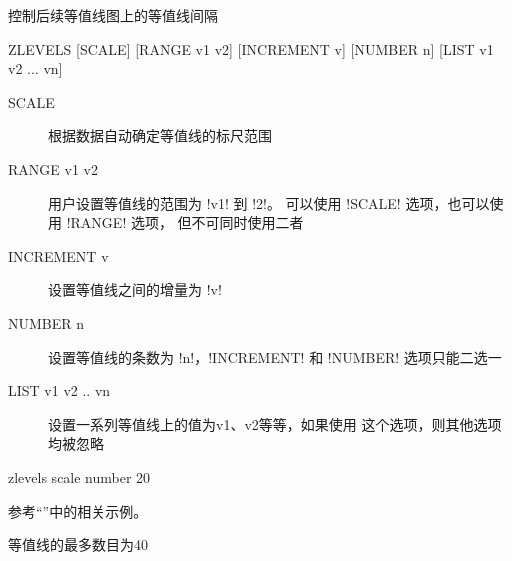 \label{cmd:zlevels}

控制后续等值线图上的等值线间隔

\begin{SACSTX}
ZLEVELS [SCALE] [RANGE v1 v2] [INCREMENT v] [NUMBER n] [LIST v1 v2 ... vn]
\end{SACSTX}

\begin{description}
\item [SCALE] 根据数据自动确定等值线的标尺范围
\item [RANGE v1 v2] 用户设置等值线的范围为 !v1! 到 !2!。
    可以使用 !SCALE! 选项，也可以使用 !RANGE! 选项，
    但不可同时使用二者
\item [INCREMENT v] 设置等值线之间的增量为 !v!
\item [NUMBER n] 设置等值线的条数为 !n!，!INCREMENT! 和
    !NUMBER! 选项只能二选一
\item [LIST v1 v2 .. vn] 设置一系列等值线上的值为v1、v2等等，如果使用
    这个选项，则其他选项均被忽略
\end{description}

\begin{SACDFT}
zlevels scale number 20
\end{SACDFT}

参考``''中的相关示例。

等值线的最多数目为40
